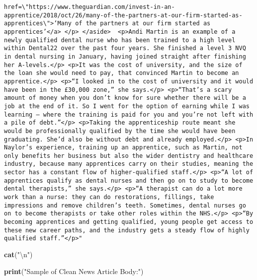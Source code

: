 \documentclass[]{article}
\newenvironment{Shaded}{\begin{snugshade}}{\end{snugshade}}
\newcommand{\KeywordTok}[1]{\textcolor[rgb]{0.13,0.29,0.53}{\textbf{#1}}}
\newcommand{\CharTok}[1]{\textcolor[rgb]{0.31,0.60,0.02}{#1}}
\newcommand{\StringTok}[1]{\textcolor[rgb]{0.31,0.60,0.02}{#1}}
\newcommand{\NormalTok}[1]{#1}
\begin{document}
\begin{verbatim}
href=\"https://www.theguardian.com/invest-in-an-apprentice/2018/oct/26/many-of-the-partners-at-our-firm-started-as-apprentices\">‘Many of the partners at our firm started as apprentices’</a> </p> </aside>  <p>Andi Martin is an example of a newly qualified dental nurse who has been trained to a high level within Dental22 over the past four years. She finished a level 3 NVQ in dental nursing in January, having joined straight after finishing her A-levels.</p> <p>It was the cost of university, and the size of the loan she would need to pay, that convinced Martin to become an apprentice.</p> <p>“I looked in to the cost of university and it would have been in the £30,000 zone,” she says.</p> <p>“That’s a scary amount of money when you don’t know for sure whether there will be a job at the end of it. So I went for the option of earning while I was learning – where the training is paid for you and you’re not left with a pile of debt.”</p> <p>Taking the apprenticeship route meant she would be professionally qualified by the time she would have been graduating. She’d also be without debt and already employed.</p> <p>In Naylor’s experience, training up an apprentice, such as Martin, not only benefits her business but also the wider dentistry and healthcare industry, because many apprentices carry on their studies, meaning the sector has a constant flow of higher-qualified staff.</p> <p>“A lot of apprentices qualify as dental nurses and then go on to study to become dental therapists,” she says.</p> <p>“A therapist can do a lot more work than a nurse: they can do restorations, fillings, take impressions and remove children’s teeth. Sometimes, dental nurses go on to become therapists or take other roles within the NHS.</p> <p>“By becoming apprentices and getting qualified, young people get access to these new career paths, and the industry gets a steady flow of highly qualified staff.”</p>"
\end{verbatim}

\begin{Shaded}
\begin{Highlighting}[]
\KeywordTok{cat}\NormalTok{(}\StringTok{"}\CharTok{\textbackslash{}n}\StringTok{"}\NormalTok{)}
\end{Highlighting}
\end{Shaded}

\begin{Shaded}
\begin{Highlighting}[]
\KeywordTok{print}\NormalTok{(}\StringTok{"Sample of Clean News Article Body:"}\NormalTok{)}
\end{Highlighting}
\end{Shaded}
\end{document}
